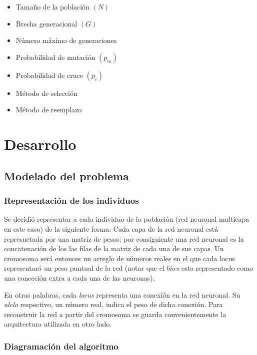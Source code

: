 \documentclass[%
    final,
    reprint,
    notitlepage,
    narroweqnarray,
    inline,
    twoside,
    invited
    ]{ieee}
\begin{document}
\begin{itemize} 
\item Tamaño de la población $(N)$
\item Brecha generacional $(G)$
\item Número máximo de generaciones
\item Probabilidad de mutación $(p_m)$
\item Probabilidad de cruce $(p_c)$
\item Método de selección
\item Método de reemplazo
\end{itemize} 



\section{Desarrollo}

\subsection{Modelado del problema}

\subsubsection{Representación de los individuos}

\par Se decidió representar a cada individuo de la población (red neuronal multicapa en este caso) 
de la siguiente forma: Cada capa de la red neuronal está represnetada por una matriz de pesos; 
por consiguiente una red neuronal es la concatenación de los las filas de la matriz de cada una de sus capas. 
Un cromosoma será entonces un arreglo de números reales en el que cada locus representará un peso 
puntual de la red (notar que el $bias$ esta representado como una conección extra a cada una de las neuronas).
\par En otras palabras, cada \textit{locus} representa una conexión en la red neuronal. Su \textit{alelo} 
respectivo, un número real, 
indica el peso de dicha conexión. Para reconstruir la red a partir del cromosoma se guarda convenientemente la 
arquitectura utilizada en otro lado.

\subsubsection{Diagramación del algoritmo}
\end{document}
